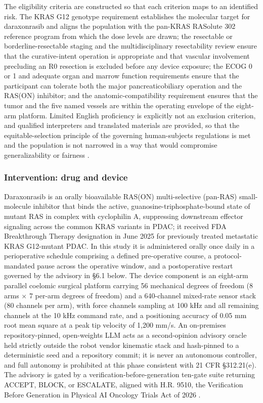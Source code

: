 The eligibility criteria are constructed so that each criterion maps to an identified
risk. The KRAS G12 genotype requirement establishes the molecular target for
daraxonrasib and aligns the population with the pan-KRAS RASolute 302 reference
program from which the dose levels are drawn; the resectable or
borderline-resectable staging and the multidisciplinary resectability review ensure
that the curative-intent operation is appropriate and that vascular involvement
precluding an R0 resection is excluded before any device exposure; the ECOG 0 or 1
and adequate organ and marrow function requirements ensure that the participant can
tolerate both the major pancreaticobiliary operation and the RAS(ON) inhibitor; and
the anatomic-compatibility requirement ensures that the tumor and the five named
vessels are within the operating envelope of the eight-arm platform. Limited English
proficiency is explicitly not an exclusion criterion, and qualified interpreters and
translated materials are provided, so that the equitable-selection principle of the
governing human-subjects regulations is met and the population is not narrowed in a
way that would compromise generalizability or fairness \cite{cfr050paiuni}.

\subsubsection*{Intervention: drug and device}

Daraxonrasib is an orally bioavailable RAS(ON) multi-selective (pan-RAS)
small-molecule inhibitor that binds the active, guanosine-triphosphate-bound state
of mutant RAS in complex with cyclophilin A, suppressing downstream effector
signaling across the common KRAS variants in PDAC; it received FDA Breakthrough
Therapy designation in June 2025 for previously treated metastatic KRAS G12-mutant
PDAC. In this study it is administered orally once daily in a perioperative
schedule comprising a defined pre-operative course, a protocol-mandated pause across
the operative window, and a postoperative restart governed by the advisory in
\S 6.1 below. The device component is an eight-arm parallel coelomic surgical
platform carrying 56 mechanical degrees of freedom (8 arms $\times$ 7 per-arm
degrees of freedom) and a 640-channel mixed-rate sensor stack (80 channels per arm),
with force channels sampling at 100 kHz and all remaining channels at the 10 kHz
command rate, and a positioning accuracy of 0.05 mm root mean square at a peak tip
velocity of 1,200 mm/s. An on-premises repository-pinned, open-weights LLM acts as a
second-opinion advisory oracle held strictly outside the robot vendor kinematic
stack and hash-pinned to a deterministic seed and a repository commit; it is never
an autonomous controller, and full autonomy is prohibited at this phase consistent
with 21 CFR \S 312.21(e). The advisory is gated by a verification-before-generation
ten-gate suite returning ACCEPT, BLOCK, or ESCALATE, aligned with H.R. 9510, the
Verification Before Generation in Physical AI Oncology Trials Act of 2026
\cite{congress9510,onpremwhippl}.


